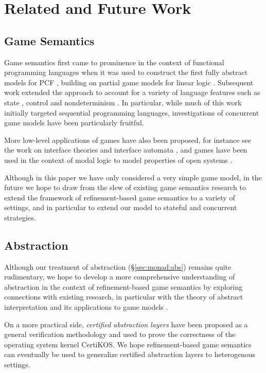 \documentclass[acmsmall,timestamp,review,anonymous]{acmart}
\begin{document}


\section{Related and Future Work} %

\subsection{Game Semantics} %

Game semantics first came to prominence
in the context of functional programming languages when
it was used to construct
the first fully abstract models for PCF
\cite{pcfajm,pcfho},
building on partial game models for linear logic
\cite{gsll,gsllaj}.
Subsequent work
extended the approach to account for a variety of
language features such as
state \cite{gsia},
control \cite{gscontrol} and
nondeterminism \cite{gsnondet}.
In particular,
while much of this work initially
targeted sequential programming languages,
investigations of concurrent game models
have been particularly fruitful.

More low-level applications of games have also been proposed,
for instance see the work on interface theories
and interface automata \cite{ia,gmos,itcd,gtf},
and games have been used in the context of modal logic
to model properties of open systems
\cite{atl,altref}.

Although in this paper we have only considered a very simple game model,
in the future we hope to draw from the slew of existing game semantics research
to extend the framework of refinement-based game semantics
to a variety of settings,
and in particular to extend our model
to stateful and concurrent strategies.


\subsection{Abstraction} %

Although our treatment of abstraction (\S\ref{sec:monad:abs})
remains quite rudimentary,
we hope to develop a more comprehensive understanding
of abstraction in the context of refinement-based game semantics
by exploring connections with existing research,
in particular with
the theory of abstract interpretation \cite{absint,aif}
and its applications to game models \cite{aigp}.

On a more practical side,
\emph{certified abstraction layers} \cite{popl15,osdi16,ccal}
have been proposed as a general verification methodology
and used to prove the correctness of the operating system kernel CertiKOS.
We hope refinement-based game semantics
can eventually be used to generalize
certified abstraction layers to heterogenous settings.
\end{document}
